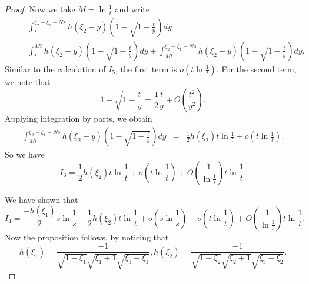 \documentclass[10pt,a4paper]{amsart}
\begin{document}
\begin{proof}
Now we take $M=\ln \frac{1}{t}$ and write 
\begin{eqnarray*}
&& \int_{t}^{\xi_2-\xi_1-Ns}  h(\xi_2-y)
 \left(1- \sqrt{1- \frac{t}{y}}\right)dy \\
 & =& \int_{t}^{Mt}  h(\xi_2-y)
 \left(1- \sqrt{1- \frac{t}{y}}\right)dy+ \int_{Mt}^{\xi_2-\xi_1-Ns}  h(\xi_2-y)
 \left(1- \sqrt{1- \frac{t}{y}}\right)dy.
\end{eqnarray*}
Similar to the calculation of  $I_5$, the first term is $o\left(t\ln\frac{1}{t}\right)$. For the second term, we note that 
$$1- \sqrt{1- \frac{t}{y}} =  \frac{1}{2} \frac{t}{y} + O\left(  \frac{t^2}{y^2}\right).$$
Applying integration by parts, we obtain 
\begin{eqnarray*}
\int_{Mt}^{\xi_2-\xi_1-Ns}  h(\xi_2-y)
 \left(1- \sqrt{1- \frac{t}{y}}\right)dy &=& \frac{1}{2}h(\xi_2) t\ln\frac{1}{t}+ o\left(t\ln\frac{1}{t}\right).
\end{eqnarray*}
So we have 
$$I_6= \frac{1}{2}h(\xi_2) t \ln \frac{1}{t} + o(t\ln\frac{1}{t})+ O\left( \frac{1}{\ln\frac{1}{s}}\right) t\ln\frac{1}{t}.$$

We have shown that 
$$I_4= \frac{-h(\xi_1)}{2}s\ln \frac{1}{s}+ \frac{1}{2}h(\xi_2) t\ln\frac{1}{t}+ o\left(s\ln \frac{1}{s}\right)+o\left(t\ln\frac{1}{t}\right)+O\left( \frac{1}{\ln\frac{1}{s}}\right) t\ln\frac{1}{t}.$$
Now the proposition follows,  by noticing that $$h(\xi_1)=\frac{-1}{\sqrt{1-\xi_1}\sqrt{\xi_1+1}\sqrt{\xi_3-\xi_1}},h(\xi_2)= \frac{-1}{\sqrt{1-\xi_2}\sqrt{\xi_2+1}\sqrt{\xi_3-\xi_2}}.$$
\end{proof}
\end{document}
